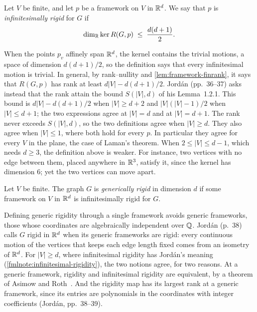\begin{definition}
  \label{def:isInfinitesimallyRigid}
  \leanok
  Let $V$ be finite, and let $p$ be a framework on $V$ in ${\mathbb{R}}^{d}$. We
  say that $p$ is \emph{infinitesimally rigid} for $G$ if
  \[
    \dim_{{\mathbb{R}}} \ker R(G, p) \;\le\; \frac{d(d+1)}{2}.
  \]
\end{definition}
\begin{fmlnote}
  \label{fmlnote:infinitesimal-rigidity}
  When the points $p_v$ affinely span ${\mathbb{R}}^{d}$, the kernel contains the
  trivial motions, a space of dimension $d(d+1)/2$, so the definition
  says that every infinitesimal motion is trivial. In general, by
  rank--nullity and \cref{lem:framework-finrank}, it says that
  $R(G, p)$ has rank at least $d|V| - d(d+1)/2$. Jord\'an (pp.~36--37)
  asks instead that the rank attain the bound $S(|V|, d)$ of his
  Lemma~1.2.1. This bound is $d|V| - d(d+1)/2$ when $|V| \ge d + 2$
  and $|V|(|V| - 1)/2$ when $|V| \le d + 1$; the two expressions agree
  at $|V| = d$ and at $|V| = d + 1$. The rank never exceeds
  $S(|V|, d)$, so the two definitions agree when $|V| \ge d$. They
  also agree when $|V| \le 1$, where both hold for every $p$. In
  particular they agree for every $V$ in the plane, the case of Laman's
  theorem. When $2 \le |V| \le d - 1$, which needs
  $d \ge 3$, the definition above is weaker. For instance, two vertices
  with no edge between them, placed anywhere in ${\mathbb{R}}^{3}$, satisfy it,
  since the kernel has dimension $6$; yet the two vertices can move
  apart.
\end{fmlnote}

\begin{definition}
  \label{def:isGenericallyRigid}
  \leanok
  Let $V$ be finite. The graph $G$ is \emph{generically rigid} in
  dimension $d$ if some framework on $V$ in ${\mathbb{R}}^{d}$ is infinitesimally
  rigid for $G$.
\end{definition}
Defining generic rigidity through a single framework avoids generic
frameworks, those whose coordinates are algebraically independent over
${\mathbb{Q}}$. Jord\'an (p.~38) calls $G$ rigid in ${\mathbb{R}}^{d}$ when its generic
frameworks are rigid: every continuous motion of the vertices that
keeps each edge length fixed comes from an isometry of ${\mathbb{R}}^{d}$. For
$|V| \ge d$, where infinitesimal rigidity has Jord\'an's meaning
(\cref{fmlnote:infinitesimal-rigidity}), the two notions agree, for
two reasons. At a generic framework, rigidity and infinitesimal
rigidity are equivalent, by a theorem of Asimow and
Roth~\cite{asimowRoth1978}. And the rigidity map has its largest rank
at a generic framework, since its entries are polynomials in the
coordinates with integer coefficients (Jord\'an, pp.~38--39).

